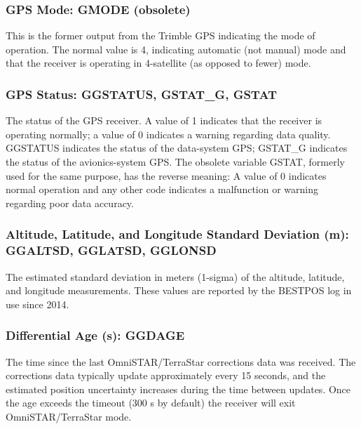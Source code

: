 \documentclass[
]{book}
\begin{document}
\hypertarget{gmode}{%
\subsubsection*{GPS Mode: GMODE (obsolete)}\label{gmode}}

This is the former output from the Trimble GPS indicating the mode of operation. The normal value is 4, indicating automatic (not manual) mode and that the receiver is operating in 4-satellite (as opposed to fewer) mode.

\hypertarget{ggstatus}{%
\subsubsection*{GPS Status: GGSTATUS, GSTAT\_G, GSTAT}\label{ggstatus}}

The status of the GPS receiver. A value of 1 indicates that the receiver is operating normally; a value of 0 indicates a warning regarding data quality. GGSTATUS indicates the status of the data-system GPS; GSTAT\_G indicates the status of the avionics-system GPS. The obsolete variable GSTAT, formerly used for the same purpose, has the reverse meaning: A value of 0 indicates normal operation and any other code indicates a malfunction or warning regarding poor data accuracy.

\hypertarget{altitude-latitude-and-longitude-standard-deviation-m-ggaltsd-gglatsd-gglonsd}{%
\subsubsection{Altitude, Latitude, and Longitude Standard Deviation (m): GGALTSD, GGLATSD, GGLONSD}\label{altitude-latitude-and-longitude-standard-deviation-m-ggaltsd-gglatsd-gglonsd}}

The estimated standard deviation in meters (1-sigma) of the altitude, latitude, and longitude measurements. These values are reported by the BESTPOS log in use since 2014.

\hypertarget{differential-age-s-ggdage}{%
\subsubsection{Differential Age (s): GGDAGE}\label{differential-age-s-ggdage}}

The time since the last OmniSTAR/TerraStar corrections data was received. The corrections data typically update approximately every 15 seconds, and the estimated position uncertainty increases during the time between updates. Once the age exceeds the timeout (300 s by default) the receiver will exit OmniSTAR/TerraStar mode.
\end{document}
